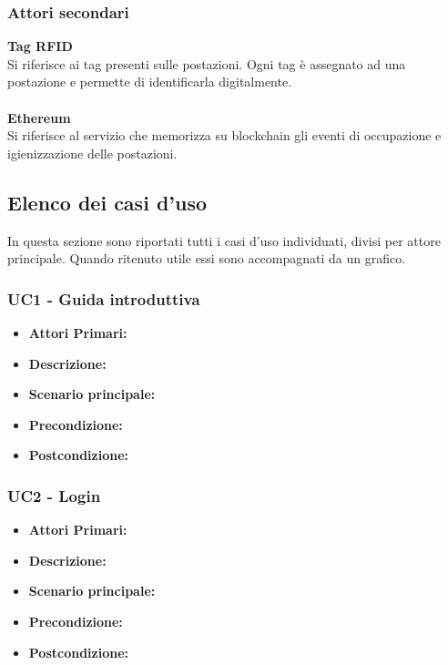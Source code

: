 \subsubsection{Attori secondari}
\textbf{Tag RFID}\\
Si riferisce ai tag presenti sulle postazioni. Ogni tag è assegnato ad una postazione e permette di identificarla digitalmente.\\
\\
\textbf{Ethereum}\\
Si riferisce al servizio che memorizza su blockchain gli eventi di occupazione e igienizzazione delle postazioni.\\

\subsection{Elenco dei casi d'uso}
In questa sezione sono riportati tutti i casi d'uso individuati, divisi per attore principale. Quando ritenuto utile essi sono accompagnati da un grafico.
\\
\subsubsection{ UC1 - Guida introduttiva}
\begin{itemize}
           	\item\textbf{Attori Primari:} 
           	\item\textbf{Descrizione:} 
           	\item\textbf{Scenario principale:} 
           	\item\textbf{Precondizione:} 
           	\item\textbf{Postcondizione:}
\end{itemize}

\subsubsection{ UC2 - Login}
\begin{itemize}
           	\item\textbf{Attori Primari:} 
           	\item\textbf{Descrizione:} 
           	\item\textbf{Scenario principale:} 
           	\item\textbf{Precondizione:} 
           	\item\textbf{Postcondizione:}
\end{itemize}

